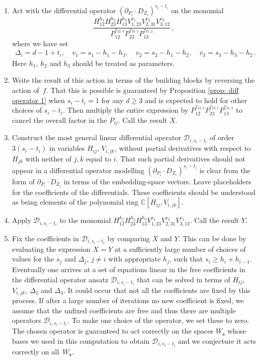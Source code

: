 \documentclass[12pt,a4paper]{extarticle}
\theoremstyle{definition}
\begin{document}
\begin{enumerate}
\item Act with the differential operator $(\partial_{P_i}\cdot D_{Z_i})^{s_i-t_i}$ on the monomial
\begin{equation*}
    \frac{H^{h_{1}}_{12}H^{h_{2}}_{23}H^{h_{3}}_{13}V^{v_1}_{1,23}V^{v_2}_{2,31}V^{v_3}_{3,12}}{P^{\tau_{12,3}}_{12}P^{\tau_{23,1}}_{23}P^{\tau_{31,2}}_{13}}\,,
\end{equation*}
where we have set
\begin{align*}
    \Delta_i=d-1+t_i, \quad v_1=s_1-h_{1}-h_{3}, \quad v_2=s_2-h_1-h_2, \quad v_3=s_3-h_3-h_2\,.
\end{align*}
Here $h_1$, $h_2$ and $h_3$ should be treated as parameters.
\item Write the result of this action in terms of the building blocks by reversing the action of~$f$. That this is possible is guaranteed by Proposition \ref{prop: diff operator 1} when $s_i-t_i=1$ for any $d\ge3$ and is expected to hold for other choices of $s_i-t_i$. Then multiply the entire expression by $P^{\tau_{12,3}}_{12}P^{\tau_{23,1}}_{23}P^{\tau_{31,2}}_{13}$
to cancel the overall factor in the $P_{ij}$. Call the result $X$.
\item Construct the most general linear differential operator $\mathcal{D}_{i,s_i-t_i}$ of order $3(s_i-t_i)$ in variables $H_{ij}$, $V_{i,jk}$, without partial derivatives with respect to $H_{jk}$ with neither of $j,k$ equal to $i$. That such partial derivatives should not appear in a differential operator modelling $(\partial_{P_i}\cdot D_{Z_i})^{s_i-t_i}$ is clear from the form of $\partial_{P_i}\cdot D_{Z_i}$ in terms of the embedding-space vectors. 
Leave placeholders for the coefficients of the differentials. These coefficients should be understood as being elements of the polynomial ring $\mathbb{C}[H_{ij},V_{i,jk}]$.
    
\item Apply $\mathcal{D}_{i,s_i-t_i}$ to the monomial $H^{h_1}_{12}H^{h_2}_{23}H^{h_3}_{13}V^{v_1}_{1,23}V^{v_2}_{2,31}V^{v_3}_{3,12}$. Call the result $Y$.

\item Fix the coefficients in $\mathcal{D}_{i,s_i-t_i}$ by comparing $X$ and $Y$. 
This can be done by evaluating the expression $X=Y$ at a sufficiently large number of choices of values for the $s_j$ and $\Delta_{j}$, $j\neq i$ with appropriate $h_j$, such that $s_i \geq h_{i} + h_{i-1}$. 
Eventually one arrives at a set of equations linear in the free coefficients in the differential operator ansatz $\mathcal{D}_{i, s_i-t_i}$ that can be solved in terms of $H_{ij}$, $V_{i,jk}$, $\Delta_2$ and $\Delta_3$. 
It could occur that not all the coefficients are fixed by this process. 
If after a large number of iterations no new coefficient is fixed, we assume that the unfixed coefficients are free and thus there are multiple operators $\mathcal{D}_{i,s_i-t_i}$. 
To make one choice of the operator, we set these to zero. 
The chosen operator is guaranteed to act correctly on the spaces $W_\mathbf{s}$ whose bases we used in this computation to obtain $\mathcal{D}_{i,s_i-t_i}$ and we conjecture it acts correctly on all~$W_\mathbf{s}$. 
\end{enumerate}
\end{document}
